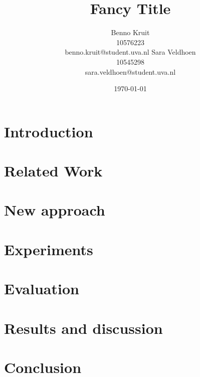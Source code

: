 \documentclass[11pt]{article}
\title{Fancy Title}
\author{Benno Kruit\\10576223\\benno.kruit@student.uva.nl\And
Sara Veldhoen\\10545298\\sara.veldhoen@student.uva.nl}
\date{\today}
\begin{document}
\maketitle


\section{Introduction}\label{s:introduction}

\section{Related Work}\label{s:relatedWork}

\section{New approach}\label{s:newApproach}

\section{Experiments}\label{s:experiments}

\section{Evaluation}\label{s:evaluation}

\section{Results and discussion}\label{s:results}

\section{Conclusion}\label{s:conclusion}




\end{document}
